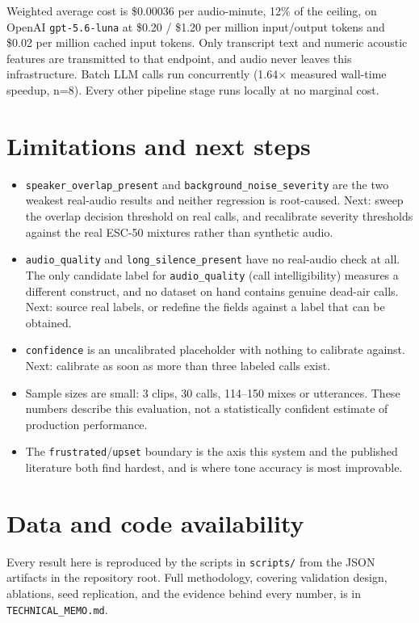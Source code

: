 \documentclass[11pt]{article}
\begin{document}
Weighted average cost is \$0.00036 per audio-minute, 12\% of the ceiling, on OpenAI \texttt{gpt-5.6-luna} at \$0.20 / \$1.20 per million input/output tokens and \$0.02 per million cached input tokens. Only transcript text and numeric acoustic features are transmitted to that endpoint, and audio never leaves this infrastructure. Batch LLM calls run concurrently (1.64$\times$ measured wall-time speedup, n=8). Every other pipeline stage runs locally at no marginal cost.

\section{Limitations and next steps}

\begin{itemize}[leftmargin=16pt, itemsep=2pt, topsep=2pt]
\item \texttt{speaker\_\allowbreak overlap\_\allowbreak present} and \texttt{background\_\allowbreak noise\_\allowbreak severity} are the two weakest real-audio results and neither regression is root-caused. Next: sweep the overlap decision threshold on real calls, and recalibrate severity thresholds against the real ESC-50 mixtures rather than synthetic audio.
\item \texttt{audio\_quality} and \texttt{long\_\allowbreak silence\_\allowbreak present} have no real-audio check at all. The only candidate label for \texttt{audio\_quality} (call intelligibility) measures a different construct, and no dataset on hand contains genuine dead-air calls. Next: source real labels, or redefine the fields against a label that can be obtained.
\item \texttt{confidence} is an uncalibrated placeholder with nothing to calibrate against. Next: calibrate as soon as more than three labeled calls exist.
\item Sample sizes are small: 3 clips, 30 calls, 114--150 mixes or utterances. These numbers describe this evaluation, not a statistically confident estimate of production performance.
\item The \texttt{frustrated}/\texttt{upset} boundary is the axis this system and the published literature both find hardest, and is where tone accuracy is most improvable.
\end{itemize}

\section*{Data and code availability}
\noindent Every result here is reproduced by the scripts in \texttt{scripts/} from the JSON artifacts in the repository root. Full methodology, covering validation design, ablations, seed replication, and the evidence behind every number, is in \texttt{TECHNICAL\_MEMO.md}.
\end{document}
